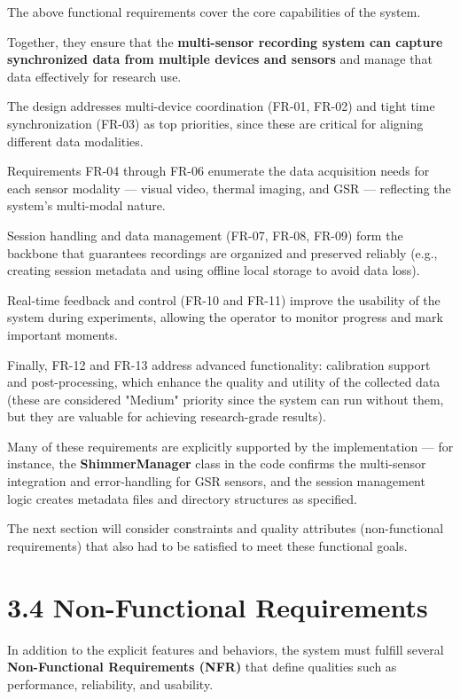 The above functional requirements cover the core capabilities of the system.

Together, they ensure that the \textbf{multi-sensor recording system can capture
synchronized data from multiple devices and sensors}
 and manage that data effectively for research use.

The design addresses multi-device coordination (FR-01, FR-02) and tight time
synchronization (FR-03) as top priorities, since these are critical for aligning
different data modalities.

Requirements FR-04 through FR-06 enumerate the data acquisition needs for each sensor
modality --- visual video, thermal imaging, and GSR --- reflecting the system's
multi-modal nature.

Session handling and data management (FR-07, FR-08, FR-09) form the backbone that
guarantees recordings are organized and preserved reliably (e.g., creating session
metadata and using offline local storage to avoid data loss).

Real-time feedback and control (FR-10 and FR-11) improve the usability of the system
during experiments, allowing the operator to monitor progress and mark important
moments.

Finally, FR-12 and FR-13 address advanced functionality: calibration support and
post-processing, which enhance the quality and utility of the collected data (these
are considered "Medium" priority since the system can run without them, but they are
valuable for achieving research-grade results).

Many of these requirements are explicitly supported by the implementation --- for
instance, the \textbf{ShimmerManager}
 class in the code confirms the multi-sensor integration and error-handling for GSR
 sensors, and the session management logic creates metadata files and directory
 structures as specified.

The next section will consider constraints and quality attributes (non-functional
requirements) that also had to be satisfied to meet these functional goals.

\section{3.4 Non-Functional Requirements}

In addition to the explicit features and behaviors, the system must fulfill several
\textbf{Non-Functional Requirements (NFR)}
 that define qualities such as performance, reliability, and usability.

